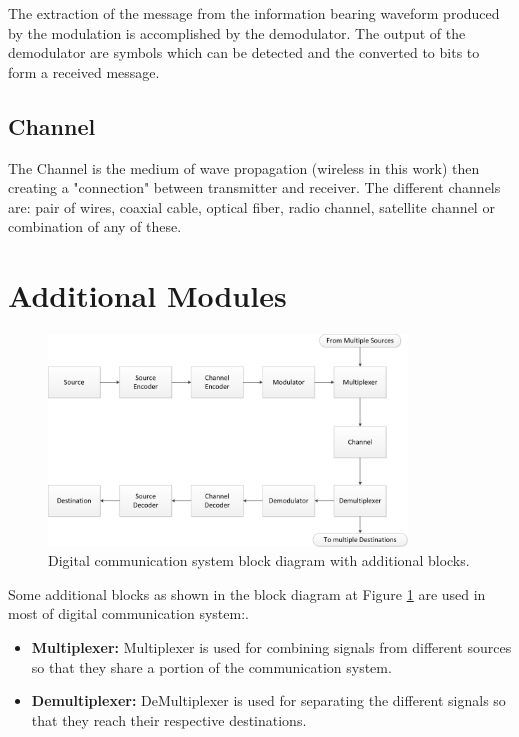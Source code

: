 The extraction of the message from the information bearing waveform produced by
the modulation is accomplished by the demodulator. The output of the demodulator
are symbols which can be detected and the converted to bits to form a received
message.

\subsection{Channel}

The Channel is the medium of wave propagation (wireless in this work) then
creating a "connection" between transmitter and receiver. The different channels
are: pair of wires, coaxial cable, optical fiber, radio channel, satellite
channel or combination of any of these.

\section{Additional Modules}

\begin{figure}[htbp]
    \centering
    \includegraphics[width=0.85\textwidth]{./figures/digicom_plus}
    \caption{ Digital communication system block diagram with additional blocks.
    \label{fig:digicomplus}}
\end{figure}

Some additional blocks as shown in the block diagram  at Figure \ref{fig:digicomplus}
are used in most of digital communication system:.

\begin{itemize}


  \item \textbf{Multiplexer:} Multiplexer is used for combining signals from
different sources so that they share a portion of the communication system.

  \item \textbf{Demultiplexer:} DeMultiplexer is used for separating the different
signals so that they reach their respective destinations.


\end{itemize}

